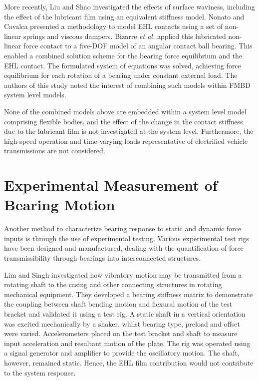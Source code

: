 More recently, Liu and Shao \cite{Liu2017b} investigated the effects of surface waviness, including the effect of the lubricant film using an equivalent stiffness model. Nonato and Cavalca \cite{Nonato2014} presented a methodology to model EHL contacts using a set of non-linear springs and viscous dampers. Bizarre \textit{et al.} \cite{Bizarre2018} applied this lubricated non-linear force contact to a five-DOF model of an angular contact ball bearing. This enabled a combined solution scheme for the bearing force equilibrium and the EHL contact. The formulated system of equations was solved, achieving force equilibrium for each rotation of a bearing under constant external load. The authors of this study noted the interest of combining such models within FMBD system level models.

None of the combined models above are embedded within a system level model comprising flexible bodies, and the effect of the change in the contact stiffness due to the lubricant film is not investigated at the system level. Furthermore, the high-speed operation and time-varying loads representative of electrified vehicle transmissions are not considered.

\section{Experimental Measurement of Bearing Motion}
Another method to characterize bearing response to static and dynamic force inputs is through the use of experimental testing. Various experimental test rigs have been designed and manufactured, dealing with the quantification of force transmissibility through bearings into interconnected structures.

Lim and Singh \cite{Lim1991a} investigated how vibratory motion may be transmitted from a rotating shaft to the casing and other connecting structures in rotating mechanical equipment. They developed a bearing stiffness matrix to demonstrate the coupling between shaft bending motion and flexural motion of the test bracket and validated it using a test rig. A static shaft in a vertical orientation was excited mechanically by a shaker, whilst bearing type, preload and offset were varied. Accelerometers placed on the test bracket and shaft to measure input acceleration and resultant motion of the plate. The rig was operated using a signal generator and amplifier to provide the oscillatory motion. The shaft, however, remained static. Hence, the EHL film contribution would not contribute to the system response.

